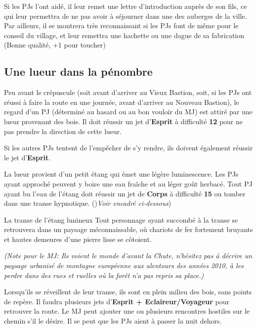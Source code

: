 \documentclass[10pt,twoside,twocolumn,openany,bg=print,justified]{dndbook}
\begin{document}
Si les PJs l'ont aidé, il leur remet une lettre d'introduction auprès de son fils, ce qui leur permettra de ne pas avoir à séjourner dans une des auberges de la ville. Par ailleurs, il se montrera très reconnaissant si les PJs font de même pour le conseil du village, et leur remettra une hachette ou une dague de sa fabrication (Bonne qualité, +1 pour toucher)

\subsection*{Une lueur dans la pénombre}

Peu avant le crépuscule (soit avant d'arriver au Vieux Bastion, soit, si les PJs ont réussi à faire la route en une journée, avant d'arriver au Nouveau Bastion), le regard d'un PJ (déterminé au hasard ou au bon vouloir du MJ) est attiré par une lueur provenant des bois. Il doit réussir un jet d'\textbf{Esprit} à difficulté \textbf{12} pour ne pas prendre la direction de cette lueur. 

Si les autres PJs tentent de l'empêcher de s'y rendre, ils doivent également réussir le jet d'\textbf{Esprit}.

La lueur provient d'un petit étang qui émet une légère luminescence. Les PJs ayant approché peuvent y boire une eau fraîche et au léger goût herbacé. Tout PJ ayant bu l'eau de l'étang doit réussir un jet de \textbf{Corps} à difficulté \textbf{15} ou tomber dans une transe hypnotique. ()\textit{Voir encadré ci-dessous})

\begin{commentbox}{La transe de l'étang lunineux}
	Tout personnage ayant succombé à la transe se retrouvera dans un paysage méconnaissable, où chariots de fer fortement bruyants et hautes demeures d'une pierre lisse se côtoient. 
	
	\textit{(Note pour le MJ: Ils voient le monde d'avant la Chute, n'hésitez pas à décrire un paysage urbanisé de montagne européenne aux alentours des années 2010, à les perdre dans des rues et ruelles où la forêt n'a pas repris sa place.)}

	Lorsqu'ils se réveillent de leur transe, ils sont en plein milieu des bois, sans points de repère. Il faudra plusieurs jets d'\textbf{Esprit + Eclaireur/Voyageur} pour retrouver la route. Le MJ peut ajouter une ou plusieurs rencontres hostiles sur le chemin s'il le désire. Il se peut que les PJs aient à passer la nuit dehors.
\end{commentbox}
\end{document}
